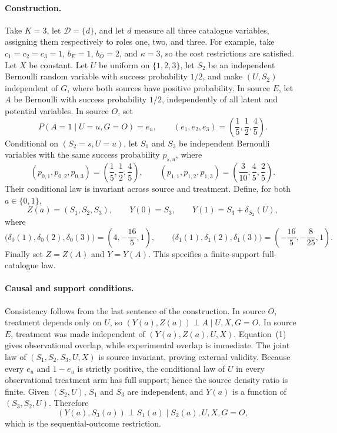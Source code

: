 \paragraph{Construction.}
Take \(K=3\), let \(\mathcal D=\{d\}\), and let \(d\) measure all three catalogue variables, assigning them respectively to roles one, two, and three.  For example, take \(c_1=c_2=c_3=1\), \(b_E=1\), \(b_O=2\), and \(\kappa=3\), so the cost restrictions are satisfied.  Let \(X\) be constant.  Let \(U\) be uniform on \(\{1,2,3\}\), let \(S_2\) be an independent Bernoulli random variable with success probability \(1/2\), and make \((U,S_2)\) independent of \(G\), where both sources have positive probability.  In source \(E\), let \(A\) be Bernoulli with success probability \(1/2\), independently of all latent and potential variables.  In source \(O\), set
\[
 P(A=1\mid U=u,G=O)=e_u,\qquad
 (e_1,e_2,e_3)=\left(\frac15,\frac12,\frac45\right).
 \tag{1}
\]
Conditional on \((S_2=s,U=u)\), let \(S_1\) and \(S_3\) be independent Bernoulli variables with the same success probability \(p_{s,u}\), where
\[
 (p_{0,1},p_{0,2},p_{0,3})
 =\left(\frac15,\frac12,\frac45\right),
 \qquad
 (p_{1,1},p_{1,2},p_{1,3})
 =\left(\frac3{10},\frac45,\frac25\right).
 \tag{2}
\]
Their conditional law is invariant across source and treatment.  Define, for both \(a\in\{0,1\}\),
\[
 Z(a)=(S_1,S_2,S_3),
 \qquad
 Y(0)=S_3,
 \qquad
 Y(1)=S_3+\delta_{S_2}(U),
 \tag{3}
\]
where
\[
 \bigl(\delta_0(1),\delta_0(2),\delta_0(3)\bigr)
 =\left(4,-\frac{16}{5},1\right),
 \qquad
 \bigl(\delta_1(1),\delta_1(2),\delta_1(3)\bigr)
 =\left(-\frac{16}{5},-\frac8{25},1\right).
 \tag{4}
\]
Finally set \(Z=Z(A)\) and \(Y=Y(A)\).  This specifies a finite-support full-catalogue law.

\paragraph{Causal and support conditions.}
Consistency follows from the last sentence of the construction.  In source \(O\), treatment depends only on \(U\), so \((Y(a),Z(a))\perp A\mid U,X,G=O\).  In source \(E\), treatment was made independent of \((Y(a),Z(a),U,X)\).  Equation~(1) gives observational overlap, while experimental overlap is immediate.  The joint law of \((S_1,S_2,S_3,U,X)\) is source invariant, proving external validity.  Because every \(e_u\) and \(1-e_u\) is strictly positive, the conditional law of \(U\) in every observational treatment arm has full support; hence the source density ratio is finite.  Given \((S_2,U)\), \(S_1\) and \(S_3\) are independent, and \(Y(a)\) is a function of \((S_3,S_2,U)\).  Therefore
\[
 (Y(a),S_3(a))\perp S_1(a)\mid S_2(a),U,X,G=O,
\]
which is the sequential-outcome restriction.

